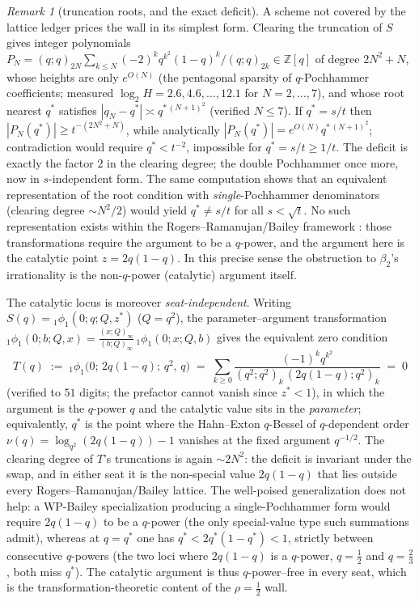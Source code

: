 \documentclass[11pt]{article}
\theoremstyle{plain}
\theoremstyle{definition}
\theoremstyle{remark}
\newtheorem{remark}[theorem]{Remark}
\newcommand{\Z}{\mathbb{Z}}
\begin{document}
\begin{remark}[truncation roots, and the exact deficit]
\label{rem:truncroot}
A scheme not covered by the lattice ledger prices the wall in its simplest form. Clearing the
truncation of $S$ gives integer polynomials
$P_N=(q;q)_{2N}\sum_{k\le N}(-2)^k q^{k^2}(1-q)^k/(q;q)_{2k}\in\Z[q]$ of degree $2N^2+N$, whose
heights are only $e^{O(N)}$ (the pentagonal sparsity of $q$-Pochhammer coefficients; measured
$\log_2H=2.6,4.6,\dots,12.1$ for $N=2,\dots,7$), and whose root nearest $q^\ast$ satisfies
$|q_N-q^\ast|\asymp q^{\ast\,(N+1)^2}$ (verified $N\le7$). If $q^\ast=s/t$ then
$|P_N(q^\ast)|\ge t^{-(2N^2+N)}$, while analytically $|P_N(q^\ast)|=e^{O(N)}q^{\ast\,(N+1)^2}$;
contradiction would require $q^\ast<t^{-2}$, impossible for $q^\ast=s/t\ge1/t$. The deficit is
exactly the factor $2$ in the clearing degree; the double Pochhammer once more, now in
$s$-independent form. The same computation shows that an equivalent representation of the root
condition with \emph{single}-Pochhammer denominators (clearing degree $\sim N^2/2$) would yield
$q^\ast\ne s/t$ for all $s<\sqrt t$. No such representation exists within the
Rogers--Ramanujan/Bailey framework \cite{GasperRahman2004}: those transformations require the argument to be a $q$-power,
and the argument here is the catalytic point $z=2q(1-q)$. In this precise sense the obstruction to
$\beta_2$'s irrationality is the non-$q$-power (catalytic) argument itself.

The catalytic locus is moreover \emph{seat-independent}. Writing $S(q)={}_1\phi_1(0;q;Q,z^\ast)$
($Q=q^2$), the parameter--argument transformation
${}_1\phi_1(0;b;Q,x)=\tfrac{(x;Q)_\infty}{(b;Q)_\infty}\,{}_1\phi_1(0;x;Q,b)$ gives the
equivalent zero condition
\[
   T(q)\;:=\;{}_1\phi_1\bigl(0;\,2q(1-q);\,q^2,\,q\bigr)
   \;=\;\sum_{k\ge0}\frac{(-1)^kq^{k^2}}{(q^2;q^2)_k\,(2q(1-q);q^2)_k}\;=\;0
\]
(verified to $51$ digits; the prefactor cannot vanish since $z^\ast<1$), in which the argument is
the $q$-power $q$ and the catalytic value sits in the \emph{parameter}; equivalently, $q^\ast$ is
the point where the Hahn--Exton $q$-Bessel of $q$-dependent order $\nu(q)=\log_{q^2}(2q(1-q))-1$
vanishes at the fixed argument $q^{-1/2}$. The clearing degree of $T$'s truncations is again
$\sim2N^2$: the deficit is invariant under the swap, and in either seat it is the non-special value
$2q(1-q)$ that lies outside every Rogers--Ramanujan/Bailey lattice. The well-poised generalization does
not help: a WP-Bailey specialization producing a single-Pochhammer form would require $2q(1-q)$ to be
a $q$-power (the only special-value type such summations admit), whereas at $q=q^\ast$ one has
$q^\ast<2q^\ast(1-q^\ast)<1$, strictly between consecutive $q$-powers (the two loci where
$2q(1-q)$ is a $q$-power, $q=\tfrac12$ and $q=\tfrac23$, both miss $q^\ast$). The catalytic argument
is thus $q$-power--free in every seat, which is the transformation-theoretic content of the
$\rho=\tfrac12$ wall.
\end{remark}
\end{document}
